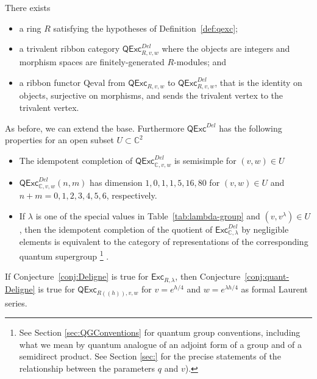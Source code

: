 \documentclass[12pt]{amsart}
\begin{document}
\begin{conjecture}\label{conj:quant-Deligne}
There exists
  \begin{itemize}
  \item a ring $R$ satisfying the hypotheses of Definition~\ref{def:qexc};
  \item a trivalent ribbon category
    $\mathsf{QExc}^{Del}_{R,v,w}$ where the objects are
    integers and morphism spaces are finitely-generated
    $R$-modules; and
  \item a ribbon functor $\mathrm{Qeval}$ from
    $\mathsf{QExc}_{R,v,w}$ to $\mathsf{QExc}^{Del}_{R,v,w}$, that
    is the identity on objects, surjective on morphisms, and sends
    the trivalent vertex to the trivalent vertex.
  \end{itemize}
As before, we can extend the base. Furthermore
$\mathsf{QExc}^{Del}$ has the following properties for an open subset
$U \subset \mathbb{C}^2$
\begin{itemize}
\item The idempotent completion of
  $\mathsf{QExc}^{Del}_{\mathbb{C},v,w}$ is semisimple for $(v,w) \in U$
\item $\mathsf{QExc}^{Del}_{\mathbb{C},v,w}(n,m)$ has dimension $1,\allowbreak0,\allowbreak1,\allowbreak1,\allowbreak5,\allowbreak16,\allowbreak80$
for $(v,w) \in U$ and $n+m=0,1,2,3,4,5,6$, respectively.
\item If $\lambda$ is one of the special values in
  Table~\ref{tab:lambda-group} and $(v,v^\lambda) \in U$, then the idempotent
  completion of the
  quotient of
  $\mathsf{Exc}^{Del}_{\mathbb{C},\lambda}$ by negligible elements is
  equivalent to the category of representations of the corresponding
  quantum supergroup \footnote{See Section \ref{sec:QGConventions} for quantum 
  group conventions, including what we mean by quantum analogue of an adjoint
  form of a group and of a semidirect product.  See Section \ref{sec:} for the 
  precise statements of the relationship between the parameters $q$ and $v$).}
.\end{itemize}
\end{conjecture}


\begin{theorem}\label{thm:classical-quantum}
  If Conjecture~\ref{conj:Deligne} is true
  for $\mathsf{Exc}_{R,\lambda}$, then
  Conjecture~\ref{conj:quant-Deligne} is true for
  $\mathsf{QExc}_{R((h)),v,w}$ for $v=e^{h/4}$ and $w=e^{\lambda
    h/4}$ as formal Laurent series.
\end{theorem}
\end{document}
